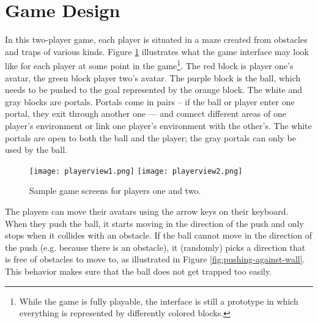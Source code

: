\section{Game Design}


In this two-player game, each player is situated in a maze created
from obstacles and traps of various kinds.  Figure
\ref{fig:player-screenshots} illustrates what the game interface may
look like for each player at some point in the
game\footnote{While the game is fully playable, the interface is still
  a prototype in which everything is represented by differently
  colored blocks.}. The red block is player one's avatar, the green
block player two's avatar. The purple block is the ball, which needs
to be pushed to the goal represented by the orange block. The white
and gray blocks are portals. Portals come in pairs -- if the ball or
player enter one portal, they exit through another one --- and connect
different areas of one player's environment or link one player's
environment with the other's. The white portals are open to both the
ball and the player; the gray portals can only be used by the ball.


\begin{figure}
\texttt{[image: playerview1.png]} 
\texttt{[image: playerview2.png]}
\caption{Sample game screens for players one and two.}
\label{fig:player-screenshots}
\end{figure}


The players can move their avatars using the arrow keys on their
keyboard. When they push the ball, it starts moving in the direction
of the push and only stops when it collides with an obstacle. If the
ball cannot move in the direction of the push (e.g. because there is
an obstacle), it (randomly) picks a direction that is free of
obstacles to move to, as illustrated in Figure
\ref{fig:pushing-against-wall}. This behavior makes sure that the ball
does not get trapped too easily.

